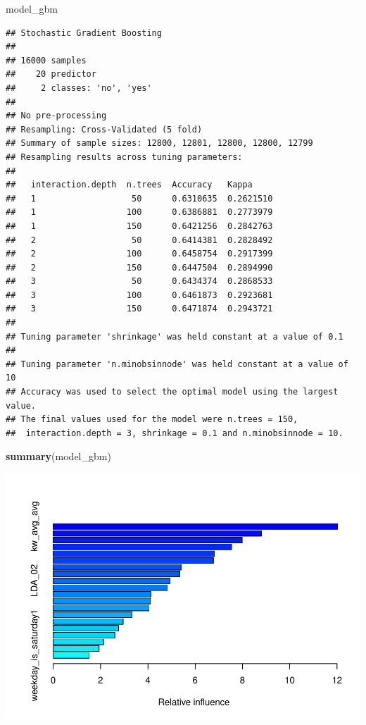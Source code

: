 \documentclass[]{article}
\newenvironment{Shaded}{\begin{snugshade}}{\end{snugshade}}
\newcommand{\KeywordTok}[1]{\textcolor[rgb]{0.13,0.29,0.53}{\textbf{#1}}}
\newcommand{\NormalTok}[1]{#1}
\begin{document}
\begin{Shaded}
\begin{Highlighting}[]
\NormalTok{model_gbm}
\end{Highlighting}
\end{Shaded}

\begin{verbatim}
## Stochastic Gradient Boosting 
## 
## 16000 samples
##    20 predictor
##     2 classes: 'no', 'yes' 
## 
## No pre-processing
## Resampling: Cross-Validated (5 fold) 
## Summary of sample sizes: 12800, 12801, 12800, 12800, 12799 
## Resampling results across tuning parameters:
## 
##   interaction.depth  n.trees  Accuracy   Kappa    
##   1                   50      0.6310635  0.2621510
##   1                  100      0.6386881  0.2773979
##   1                  150      0.6421256  0.2842763
##   2                   50      0.6414381  0.2828492
##   2                  100      0.6458754  0.2917399
##   2                  150      0.6447504  0.2894990
##   3                   50      0.6434374  0.2868533
##   3                  100      0.6461873  0.2923681
##   3                  150      0.6471874  0.2943721
## 
## Tuning parameter 'shrinkage' was held constant at a value of 0.1
## 
## Tuning parameter 'n.minobsinnode' was held constant at a value of 10
## Accuracy was used to select the optimal model using the largest value.
## The final values used for the model were n.trees = 150,
##  interaction.depth = 3, shrinkage = 0.1 and n.minobsinnode = 10.
\end{verbatim}

\begin{Shaded}
\begin{Highlighting}[]
\KeywordTok{summary}\NormalTok{(model_gbm)}
\end{Highlighting}
\end{Shaded}

\includegraphics{news_data_prep_files/figure-latex/unnamed-chunk-6-1.pdf}
\end{document}
